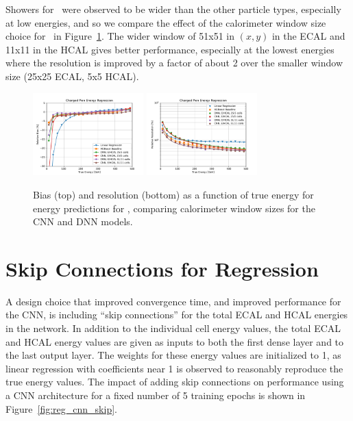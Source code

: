 Showers for \chpi\ were observed to be wider than the other particle types, especially at low energies, and so we compare the effect of the calorimeter window size choice for \chpi\ in Figure~\ref{fig:reg_nn_numcells_chpi_large_window}.  The wider window of 51x51 in $(x,y)$ in the ECAL and 11x11 in the HCAL gives better performance, especially at the lowest energies where the resolution is improved by a factor of about 2 over the smaller window size (25x25 ECAL, 5x5 HCAL).

\begin{figure}[htbp]
\centering
\includegraphics[width=0.38\textwidth]{Images/Calo/bias_vs_E_ChPiFixed_Cut30_nn_numcells.pdf}
\includegraphics[width=0.38\textwidth]{Images/Calo/res_vs_E_ChPiFixed_Cut30_nn_numcells_fits.pdf}
\caption{Bias (top) and resolution (bottom) as a function of true energy for energy predictions for \chpi, comparing calorimeter window sizes for the CNN and DNN models.
}
\label{fig:reg_nn_numcells_chpi_large_window}
\end{figure}

\chapter{Skip Connections for Regression}\label{app:skip_connections}

A design choice that improved convergence time, and improved performance for the CNN, is including ``skip connections'' for the total ECAL and HCAL energies in the network.  In addition to the individual cell energy values, the total ECAL and HCAL energy values are given as inputs to both the first dense layer and to the last output layer.  The weights for these energy values are initialized to 1, as linear regression with coefficients near 1 is observed to reasonably reproduce the true energy values.  The impact of adding skip connections on performance using a CNN architecture for a fixed number of 5 training epochs is shown in Figure~\ref{fig:reg_cnn_skip}.

